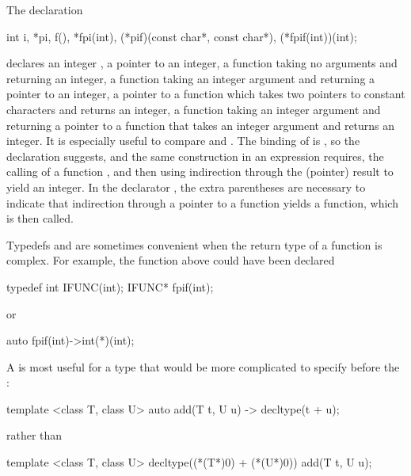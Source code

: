 \pnum
\begin{example}
The declaration

%
\begin{codeblock}
int i,
    *pi,
    f(),
    *fpi(int),
    (*pif)(const char*, const char*),
    (*fpif(int))(int);
\end{codeblock}

declares an integer
,
a pointer
to an integer,
a function
taking no arguments and returning an integer,
a function
taking an integer argument and returning a pointer to an integer,
a pointer
to a function which
takes two pointers to constant characters and returns an integer,
a function
taking an integer argument and returning a pointer to a function that takes an integer argument and returns an integer.
It is especially useful to compare
and
.
The binding of
is
,
so the declaration suggests,
and the same construction in an expression
requires, the calling of a function
,
and then using indirection through the (pointer) result
to yield an integer.
In the declarator
,
the extra parentheses are necessary to indicate that indirection through
a pointer to a function yields a function, which is then called.
\end{example}
\begin{note}
Typedefs and  are sometimes convenient when the return type of a function is complex.
For example,
the function
above could have been declared

\begin{codeblock}
typedef int  IFUNC(int);
IFUNC*  fpif(int);
\end{codeblock}

or

\begin{codeblock}
auto fpif(int)->int(*)(int);
\end{codeblock}

A  is most useful for a type that would be more complicated to specify before the :

\begin{codeblock}
template <class T, class U> auto add(T t, U u) -> decltype(t + u);
\end{codeblock}

rather than

\begin{codeblock}
template <class T, class U> decltype((*(T*)0) + (*(U*)0)) add(T t, U u);
\end{codeblock}
\end{note}

